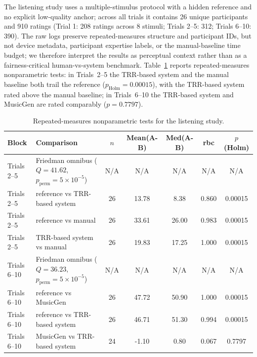 \documentclass[journal,10pt]{IEEEtran}
\begin{document}
The listening study uses a multiple-stimulus protocol with a hidden reference and no explicit low-quality anchor; across all trials it contains 26 unique participants and 910 ratings (Trial 1: 208 ratings across 8 stimuli; Trials 2--5: 312; Trials 6--10: 390). The raw logs preserve repeated-measures structure and participant IDs, but not device metadata, participant expertise labels, or the manual-baseline time budget; we therefore interpret the results as perceptual context rather than as a fairness-critical human-vs-system benchmark. Table~\ref{tab:listening_tests} reports repeated-measures nonparametric tests: in Trials~2--5 the TRR-based system and the manual baseline both trail the reference ($p_{\mathrm{Holm}}=0.00015$), with the TRR-based system rated above the manual baseline; in Trials~6--10 the TRR-based system and MusicGen are rated comparably ($p=0.7797$).

\begin{table}[t]
\centering
\caption{Repeated-measures nonparametric tests for the listening study.}
\label{tab:listening_tests}
\footnotesize
\setlength{\tabcolsep}{3.5pt}
\begin{tabular*}{\textwidth}{@{\extracolsep{\fill}}llccccc}
\toprule
\textbf{Block} & \textbf{Comparison} & \textbf{$n$} & \textbf{Mean(A-B)} & \textbf{Med(A-B)} & \textbf{rbc} & \textbf{$p$ (Holm)} \\
\midrule
Trials 2--5 & Friedman omnibus ($Q=41.62$, $p_{\mathrm{perm}}=5\times10^{-5}$) & N/A & N/A & N/A & N/A & N/A \\
Trials 2--5 & reference vs TRR-based system & 26 & 13.78 & 8.38 & 0.860 & 0.00015 \\
Trials 2--5 & reference vs manual & 26 & 33.61 & 26.00 & 0.983 & 0.00015 \\
Trials 2--5 & TRR-based system vs manual & 26 & 19.83 & 17.25 & 1.000 & 0.00015 \\
Trials 6--10 & Friedman omnibus ($Q=36.23$, $p_{\mathrm{perm}}=5\times10^{-5}$) & N/A & N/A & N/A & N/A & N/A \\
Trials 6--10 & reference vs MusicGen & 26 & 47.72 & 50.90 & 1.000 & 0.00015 \\
Trials 6--10 & reference vs TRR-based system & 26 & 46.71 & 51.30 & 0.994 & 0.00015 \\
Trials 6--10 & MusicGen vs TRR-based system & 24 & -1.10 & 0.80 & 0.067 & 0.7797 \\
\bottomrule
\end{tabular*}
\end{table}
\end{document}
